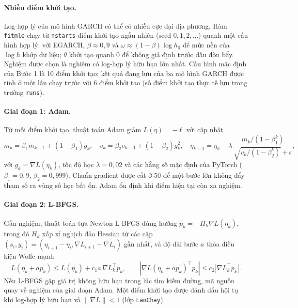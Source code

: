 \documentclass[11pt,a4paper]{article}
\renewcommand{\_}{\gachduoi\allowbreak}
\newcommand{\tep}[1]{\texttt{#1}}
\newcommand{\ham}[1]{\texttt{#1}}
\begin{document}
\paragraph{Nhiều điểm khởi tạo.} Log-hợp lý của mô hình GARCH có thể có nhiều cực đại địa phương. Hàm \ham{fit\_mle} chạy từ \tep{n\_starts} điểm khởi tạo ngẫu nhiên (seed $0,1,2,\dots$) quanh một cấu hình hợp lý: với EGARCH, $\beta\approx0{,}9$ và $\omega\approx(1-\beta)\log h_0$ để mức nền của $\log h$ khớp dữ liệu; $\theta$ khởi tạo quanh 0 để không giả định trước dấu đòn bẩy. Nghiệm được chọn là nghiệm có log-hợp lý hữu hạn lớn nhất. Cấu hình mặc định của Bước 1 là 10 điểm khởi tạo; kết quả đang lưu của ba mô hình GARCH được tính ở một lần chạy trước với 6 điểm khởi tạo (số điểm khởi tạo thực tế lưu trong trường \tep{runs}).

\paragraph{Giai đoạn 1: Adam.} Từ mỗi điểm khởi tạo, thuật toán Adam \cite{kingma2015adam} giảm $L(\eta)=-\ell$ với cập nhật
\begin{equation}
m_k=\beta_1m_{k-1}+(1-\beta_1)g_k,\quad v_k=\beta_2v_{k-1}+(1-\beta_2)g_k^2,\quad
\eta_{k+1}=\eta_k-\lambda\,\frac{m_k/(1-\beta_1^k)}{\sqrt{v_k/(1-\beta_2^k)}+\epsilon},
\end{equation}
với $g_k=\nabla L(\eta_k)$, tốc độ học $\lambda=0{,}02$ và các hằng số mặc định của PyTorch ($\beta_1=0{,}9$, $\beta_2=0{,}999$). Chuẩn gradient được cắt ở 50 để một bước lớn không đẩy tham số ra vùng số học bất ổn. Adam ổn định khi điểm hiện tại còn xa nghiệm.

\paragraph{Giai đoạn 2: L-BFGS.} Gần nghiệm, thuật toán tựa Newton L-BFGS \cite{liu1989lbfgs,nocedal2006} dùng hướng $p_k=-H_k\nabla L(\eta_k)$, trong đó $H_k$ xấp xỉ nghịch đảo Hessian từ các cặp $(s_i,y_i)=(\eta_{i+1}-\eta_i,\nabla L_{i+1}-\nabla L_i)$ gần nhất, và độ dài bước $a$ thỏa điều kiện Wolfe mạnh
\begin{equation}
L(\eta_k+a p_k)\le L(\eta_k)+c_1a\,\nabla L_k^{\!\top}p_k,\qquad
|\nabla L(\eta_k+ap_k)^{\!\top}p_k|\le c_2|\nabla L_k^{\!\top}p_k| .
\end{equation}
Nếu L-BFGS gặp giá trị không hữu hạn trong lúc tìm kiếm đường, mã nguồn quay về nghiệm của giai đoạn Adam. Một điểm khởi tạo được đánh dấu hội tụ khi log-hợp lý hữu hạn và $\|\nabla L\|<1$ (lớp \tep{LanChay}).
\end{document}
